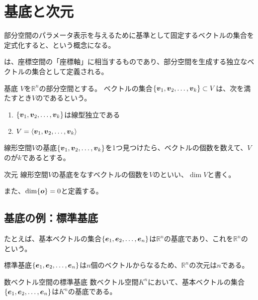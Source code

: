 \documentclass[../../../topic_linear-algebra]{subfiles}
\begin{document}
\sectionline
\section{基底と次元}

部分空間のパラメータ表示を与えるために基準として固定するベクトルの集合を定式化すると、という概念になる。

\br

は、座標空間の「座標軸」に相当するものであり、部分空間を生成する独立なベクトルの集合として定義される。

\begin{definition}{基底}
  $V$を$\mathbb{R}^n$の部分空間とする。
  ベクトルの集合$\{ \vb*{v}_1, \vb*{v}_2, \dots, \vb*{v}_k \} \subset V$は、次を満たすとき$V$のであるという。
  \begin{enumerate}[label=\romanlabel]
    \item $\{ \vb*{v}_1, \vb*{v}_2, \dots, \vb*{v}_k \}$は線型独立である
    \item $V = \langle \vb*{v}_1, \vb*{v}_2, \dots, \vb*{v}_k \rangle$
  \end{enumerate}
\end{definition}

\br

線形空間$V$の基底$\{ \vb*{v}_1, \vb*{v}_2, \dots, \vb*{v}_k \}$を1つ見つけたら、ベクトルの個数を数えて、$V$のが$k$であるとする。

\begin{definition}{次元}\label{def:dimension-of-vector-space}
  線形空間$V$の基底をなすベクトルの個数を$V$のといい、$\dim V$と書く。

  また、$\dim\{\vb*{o}\} = 0$と定義する。
\end{definition}

\subsection{基底の例：標準基底}

たとえば、基本ベクトルの集合$\{ \vb*{e}_1, \vb*{e}_2, \dots, \vb*{e}_n \}$は$\mathbb{R}^n$の基底であり、これを$\mathbb{R}^n$のという。

標準基底$\{ \vb*{e}_1, \vb*{e}_2, \dots, \vb*{e}_n \}$は$n$個のベクトルからなるため、$\mathbb{R}^n$の次元は$n$である。

\begin{theorem*}{数ベクトル空間の標準基底}
  数ベクトル空間$K^n$において、基本ベクトルの集合$\{ \vb*{e}_1, \vb*{e}_2, \dots, \vb*{e}_n \}$は$K^n$の基底である。
\end{theorem*}
\end{document}
